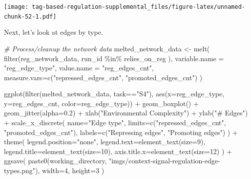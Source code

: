 \documentclass[
]{book}
\newenvironment{Shaded}{\begin{snugshade}}{\end{snugshade}}
\newcommand{\AttributeTok}[1]{\textcolor[rgb]{0.77,0.63,0.00}{#1}}
\newcommand{\CommentTok}[1]{\textcolor[rgb]{0.56,0.35,0.01}{\textit{#1}}}
\newcommand{\DecValTok}[1]{\textcolor[rgb]{0.00,0.00,0.81}{#1}}
\newcommand{\FloatTok}[1]{\textcolor[rgb]{0.00,0.00,0.81}{#1}}
\newcommand{\FunctionTok}[1]{\textcolor[rgb]{0.00,0.00,0.00}{#1}}
\newcommand{\NormalTok}[1]{#1}
\newcommand{\OtherTok}[1]{\textcolor[rgb]{0.56,0.35,0.01}{#1}}
\newcommand{\SpecialCharTok}[1]{\textcolor[rgb]{0.00,0.00,0.00}{#1}}
\newcommand{\StringTok}[1]{\textcolor[rgb]{0.31,0.60,0.02}{#1}}
\begin{document}
\texttt{[image: tag-based-regulation-supplemental\_files/figure-latex/unnamed-chunk-52-1.pdf]}

Next, let's look at edges by type.

\begin{Shaded}
\begin{Highlighting}[]
\CommentTok{\# Process/cleanup the network data}
\NormalTok{melted\_network\_data }\OtherTok{\textless{}{-}} \FunctionTok{melt}\NormalTok{(}
  \FunctionTok{filter}\NormalTok{(reg\_network\_data,}
\NormalTok{         run\_id }\SpecialCharTok{\%in\%}\NormalTok{ relies\_on\_reg}
\NormalTok{        ),}
  \AttributeTok{variable.name =} \StringTok{"reg\_edge\_type"}\NormalTok{,}
  \AttributeTok{value.name =} \StringTok{"reg\_edges\_cnt"}\NormalTok{,}
  \AttributeTok{measure.vars=}\FunctionTok{c}\NormalTok{(}\StringTok{"repressed\_edges\_cnt"}\NormalTok{, }\StringTok{"promoted\_edges\_cnt"}\NormalTok{)}
\NormalTok{)}

\FunctionTok{ggplot}\NormalTok{(}\FunctionTok{filter}\NormalTok{(melted\_network\_data, task}\SpecialCharTok{==}\StringTok{"S4"}\NormalTok{), }\FunctionTok{aes}\NormalTok{(}\AttributeTok{x=}\NormalTok{reg\_edge\_type, }\AttributeTok{y=}\NormalTok{reg\_edges\_cnt, }\AttributeTok{color=}\NormalTok{reg\_edge\_type)) }\SpecialCharTok{+}
  \FunctionTok{geom\_boxplot}\NormalTok{() }\SpecialCharTok{+}
  \FunctionTok{geom\_jitter}\NormalTok{(}\AttributeTok{alpha=}\FloatTok{0.2}\NormalTok{) }\SpecialCharTok{+}
  \FunctionTok{xlab}\NormalTok{(}\StringTok{"Environmental Complexity"}\NormalTok{) }\SpecialCharTok{+}
  \FunctionTok{ylab}\NormalTok{(}\StringTok{"\# Edges"}\NormalTok{) }\SpecialCharTok{+}
  \FunctionTok{scale\_x\_discrete}\NormalTok{(}
    \AttributeTok{name=}\StringTok{"Edge type"}\NormalTok{,}
    \AttributeTok{limits=}\FunctionTok{c}\NormalTok{(}\StringTok{"repressed\_edges\_cnt"}\NormalTok{, }\StringTok{"promoted\_edges\_cnt"}\NormalTok{),}
    \AttributeTok{labels=}\FunctionTok{c}\NormalTok{(}\StringTok{"Repressing edges"}\NormalTok{, }\StringTok{"Promoting edges"}\NormalTok{)}
\NormalTok{  ) }\SpecialCharTok{+}
  \FunctionTok{theme}\NormalTok{(}
    \AttributeTok{legend.position=}\StringTok{"none"}\NormalTok{,}
    \AttributeTok{legend.text=}\FunctionTok{element\_text}\NormalTok{(}\AttributeTok{size=}\DecValTok{9}\NormalTok{),}
    \AttributeTok{legend.title=}\FunctionTok{element\_text}\NormalTok{(}\AttributeTok{size=}\DecValTok{10}\NormalTok{),}
    \AttributeTok{axis.title.x=}\FunctionTok{element\_text}\NormalTok{(}\AttributeTok{size=}\DecValTok{12}\NormalTok{)}
\NormalTok{  ) }\SpecialCharTok{+}
  \FunctionTok{ggsave}\NormalTok{(}
    \FunctionTok{paste0}\NormalTok{(working\_directory, }\StringTok{"imgs/context{-}signal{-}regulation{-}edge{-}types.png"}\NormalTok{),}
    \AttributeTok{width=}\DecValTok{4}\NormalTok{,}
    \AttributeTok{height=}\DecValTok{3}
\NormalTok{  )}
\end{Highlighting}
\end{Shaded}
\end{document}
